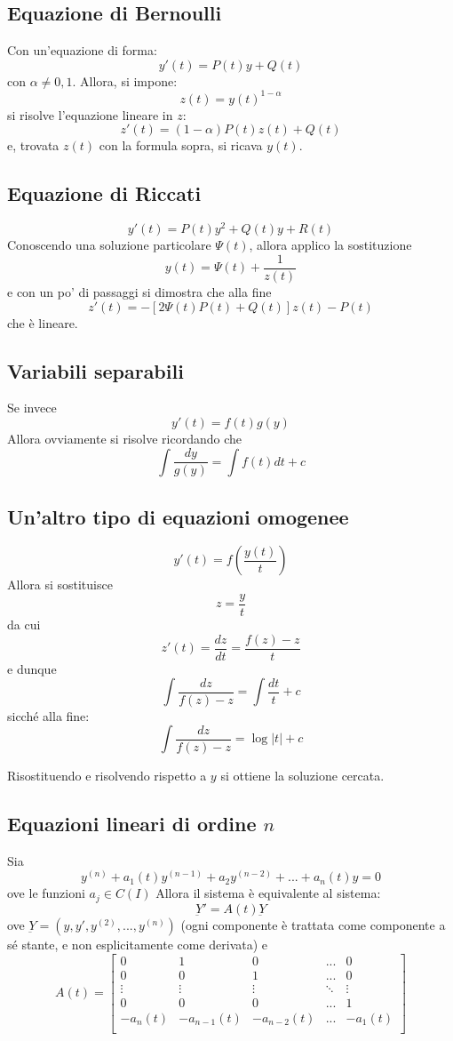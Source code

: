\documentclass[a4paper,12pt]{article}
\begin{document}
\subsection{Equazione di Bernoulli}
Con un'equazione di forma:
$$y'(t) = P(t)y+Q(t)$$
con $\alpha \neq 0, 1$. Allora, si impone:
$$ z(t)=y(t)^{1-\alpha} $$
si risolve l'equazione lineare in $z$: $$z'(t)=(1-\alpha)P(t)z(t)+Q(t)$$ e, trovata $z(t)$ con la formula sopra, si ricava $y(t)$.

\subsection{Equazione di Riccati}
$$y'(t) = P(t)y^2+Q(t)y+R(t)$$
Conoscendo una soluzione particolare $\Psi(t)$, allora applico la sostituzione
$$y(t)=\Psi(t)+\dfrac{1}{z(t)}$$
e con un po' di passaggi si dimostra che alla fine
$$z'(t)= -\left[2\Psi(t)P(t)+Q(t)\right]z(t)-P(t)$$
che è lineare.
\subsection{Variabili separabili}
Se invece
$$y'(t) = f(t)g(y)$$
Allora ovviamente si risolve ricordando che
$$\int\dfrac{dy}{g(y)}=\int f(t)dt + c$$
\subsection{Un'altro tipo di equazioni omogenee}
$$y'(t) = f\left(\dfrac{y(t)}{t}\right)$$
Allora si sostituisce
$$z=\dfrac{y}{t}$$
da cui $$z'(t) = \dfrac{dz}{dt} = \dfrac{f(z)-z}{t}$$
e dunque
$$\int\dfrac{dz}{f(z)-z}=\int \dfrac{dt}{t} + c$$
sicché alla fine:
$$\int\dfrac{dz}{f(z)-z} = \log|t| + c$$

Risostituendo e risolvendo rispetto a $y$ si ottiene la soluzione cercata.

\subsection{Equazioni lineari di ordine $n$}
Sia
$$y^{(n)} + a_1(t)y^{(n-1)} + a_2y^{(n-2)} + ... + a_n(t)y = 0$$
ove le funzioni $a_j \in C(I)$
Allora il sistema è equivalente al sistema:
$$\underbar{Y}' = A(t)\underbar{Y}$$
ove $\underbar{Y}=(y, y', y^{(2)}, ..., y^{(n)})$ (ogni componente è trattata come componente a sé stante, e non esplicitamente come derivata) e
$$A(t) =
\begin{bmatrix}
0 & 1 & 0 & ... & 0\\
0 & 0 & 1 & ... & 0\\
\vdots & \vdots & \vdots & \ddots & \vdots \\
0 & 0 & 0 & ... & 1 \\
-a_n(t) & -a_{n-1}(t) & -a_{n-2}(t) & ... & -a_{1}(t) \\
\end{bmatrix}
$$
\end{document}
